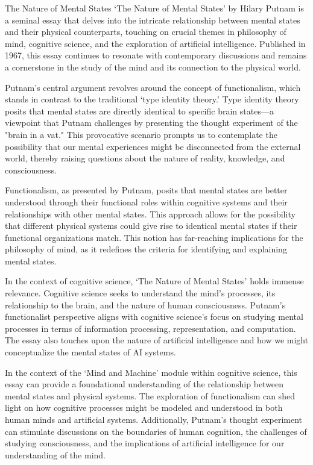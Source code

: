 \begin{notes}{The Nature of Mental States}
    `The Nature of Mental States' by Hilary Putnam is a seminal essay that delves into the intricate relationship between mental states and their physical counterparts, touching on crucial themes in
    philosophy of mind, cognitive science, and the exploration of artificial intelligence. Published in 1967, this essay continues to resonate with contemporary discussions and remains a cornerstone 
    in the study of the mind and its connection to the physical world.

    Putnam's central argument revolves around the concept of functionalism, which stands in contrast to the traditional `type identity theory.' Type identity theory posits that mental states are 
    directly identical to specific brain states—a viewpoint that Putnam challenges by presenting the thought experiment of the "brain in a vat." This provocative scenario prompts us to contemplate the 
    possibility that our mental experiences might be disconnected from the external world, thereby raising questions about the nature of reality, knowledge, and consciousness.
    
    Functionalism, as presented by Putnam, posits that mental states are better understood through their functional roles within cognitive systems and their relationships with other mental states. This 
    approach allows for the possibility that different physical systems could give rise to identical mental states if their functional organizations match. This notion has far-reaching implications for 
    the philosophy of mind, as it redefines the criteria for identifying and explaining mental states.
    
    In the context of cognitive science, `The Nature of Mental States' holds immense relevance. Cognitive science seeks to understand the mind's processes, its relationship to the brain, and the nature 
    of human consciousness. Putnam's functionalist perspective aligns with cognitive science's focus on studying mental processes in terms of information processing, representation, and computation. The 
    essay also touches upon the nature of artificial intelligence and how we might conceptualize the mental states of AI systems.
    
    In the context of the `Mind and Machine' module within cognitive science, this essay can provide a foundational understanding of the relationship between mental states and physical systems. The 
    exploration of functionalism can shed light on how cognitive processes might be modeled and understood in both human minds and artificial systems. Additionally, Putnam's thought experiment can stimulate 
    discussions on the boundaries of human cognition, the challenges of studying consciousness, and the implications of artificial intelligence for our understanding of the mind.
    

\end{notes}
